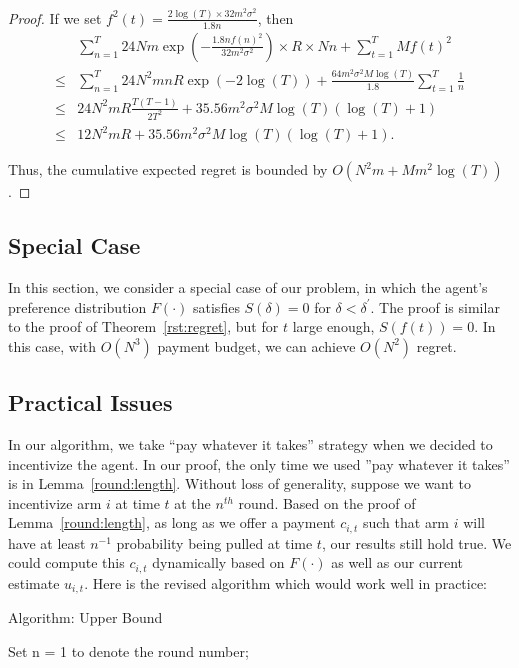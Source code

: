 \documentclass{article}
\begin{document}
\begin{proof}
If we set $f^2(t)=\frac{2\log(T)\times 32m^2\sigma^2}{1.8n}$, then
\begin{align}
&\sum_{n=1}^{T} 24Nm\exp\left(-\frac{1.8n f(n)^2}{32 m^2\sigma^2}\right)\times R \times Nn+ \sum_{t=1}^{T}Mf(t)^2 \nonumber \\ 
\leq & \sum_{n=1}^{T} 24N^2 mnR \exp\left(-2\log(T)\right)  + \frac{64m^2\sigma^2 M\log(T)}{1.8}\sum_{t=1}^{T}\frac{1}{n} \nonumber \\
\leq &  24N^2 m R\frac{T(T-1)}{2T^2}  + 35.56 m^2\sigma^2 M\log(T)(\log(T)+1) \nonumber \\
\leq &  12 N^2 m R  + 35.56 m^2\sigma^2 M\log(T)(\log(T)+1). \nonumber
\end{align}

Thus, the cumulative expected regret is bounded by $O(N^2 m + M m^2\log(T))$.
\end{proof}


\subsection{Special Case}

In this section, we consider a special case of our problem, in which the agent's preference distribution $F(\cdot)$ satisfies $S(\delta)=0$ for $\delta<\delta^{'}$. The proof is similar to the proof of Theorem~\ref{rst:regret}, but for $t$ large enough, $S(f(t))=0$. In this case, with $O(N^3)$ payment budget, we can achieve $O(N^2)$ regret.

\subsection{Practical Issues}
\label{sec:pi}

In our algorithm, we take ``pay whatever it takes'' strategy when we decided to incentivize the agent. In our proof, the only time we used ''pay whatever it takes'' is in Lemma~\ref{round:length}. Without loss of generality, suppose we want to incentivize arm $i$ at time $t$ at the $n^{th}$ round. Based on the proof of Lemma~\ref{round:length}, as long as we offer a payment $c_{i,t}$ such that arm $i$ will have at least $n^{-1}$ probability being pulled at time $t$, our results still hold true. We could compute this $c_{i,t}$ dynamically based on $F(\cdot)$ as well as our current estimate $u_{i,t}$. Here is the revised algorithm which would work well in practice:

\begin{algorithm}
\caption{Algorithm: Upper Bound}
\label{Alg2}
\begin{algorithmic}
\STATE Set n = 1 to denote the round number;
\ENDFOR

\end{algorithmic}
\end{algorithm}
\end{document}
